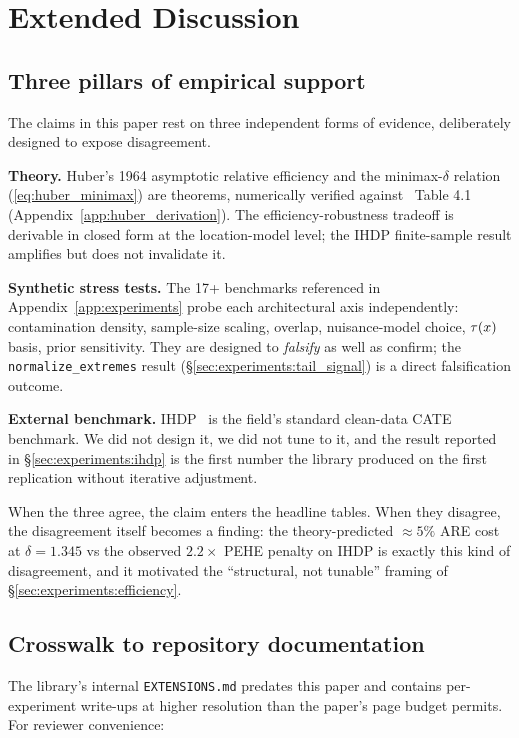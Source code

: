\section{Extended Discussion}
\label{app:discussion}

\subsection{Three pillars of empirical support}
\label{app:discussion:pillars}
The claims in this paper rest on three independent forms of
evidence, deliberately designed to expose disagreement.

\textbf{Theory.} Huber's 1964 asymptotic relative efficiency and the
minimax-$\delta$ relation (\eqref{eq:huber_minimax}) are theorems,
numerically verified against~\citet{huber2009robust} Table 4.1
(Appendix~\ref{app:huber_derivation}). The efficiency-robustness
tradeoff is derivable in closed form at the location-model level;
the IHDP finite-sample result amplifies but does not invalidate it.

\textbf{Synthetic stress tests.} The 17+ benchmarks referenced in
Appendix~\ref{app:experiments} probe each architectural axis
independently: contamination density, sample-size scaling, overlap,
nuisance-model choice, $\tau(x)$ basis, prior sensitivity. They are
designed to \emph{falsify} as well as confirm; the
\texttt{normalize\_extremes} result
(\S\ref{sec:experiments:tail_signal}) is a direct falsification
outcome.

\textbf{External benchmark.} IHDP~\citep{hill2011bayesian} is the
field's standard clean-data CATE benchmark. We did not design it, we
did not tune to it, and the result reported in
\S\ref{sec:experiments:ihdp} is the first number the library
produced on the first replication without iterative adjustment.

When the three agree, the claim enters the headline tables. When
they disagree, the disagreement itself becomes a finding: the
theory-predicted $\approx 5\%$ ARE cost at $\delta = 1.345$ vs the
observed $2.2 \times$ PEHE penalty on IHDP is exactly this kind of
disagreement, and it motivated the ``structural, not tunable''
framing of \S\ref{sec:experiments:efficiency}.

\subsection{Crosswalk to repository documentation}
\label{app:discussion:crosswalk}
The library's internal \texttt{EXTENSIONS.md} predates this
paper and contains per-experiment write-ups at higher resolution
than the paper's page budget permits. For reviewer convenience:

